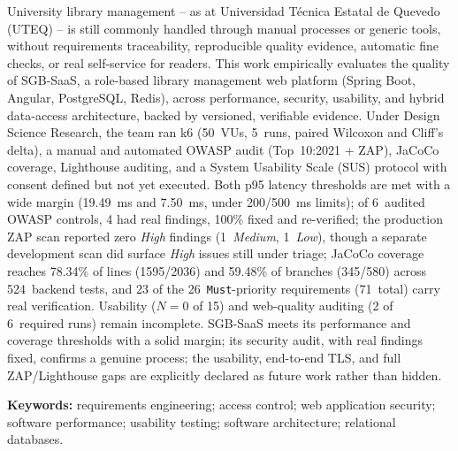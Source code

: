 University library management -- as at Universidad Técnica Estatal de
Quevedo (UTEQ) -- is still commonly handled through manual processes or
generic tools, without requirements traceability, reproducible quality
evidence, automatic fine checks, or real self-service for readers. This
work empirically evaluates the quality of SGB-SaaS, a role-based
library management web platform (Spring Boot, Angular, PostgreSQL,
Redis), across performance, security, usability, and hybrid data-access
architecture, backed by versioned, verifiable evidence. Under Design
Science Research, the team ran k6 (50~VUs, 5~runs, paired Wilcoxon and
Cliff's delta), a manual and automated OWASP audit (Top~10:2021 + ZAP),
JaCoCo coverage, Lighthouse auditing, and a System Usability Scale
(SUS) protocol with consent defined but not yet executed. Both p95
latency thresholds are met with a wide margin (19.49~ms and 7.50~ms,
under 200/500~ms limits); of 6~audited OWASP controls, 4 had real
findings, 100\% fixed and re-verified; the production ZAP scan reported
zero \emph{High} findings (1~\emph{Medium}, 1~\emph{Low}), though a
separate development scan did surface \emph{High} issues still under
triage; JaCoCo coverage reaches 78.34\% of lines (1595/2036) and 59.48\% of
branches (345/580) across 524~backend tests, and 23 of the
26~\texttt{Must}-priority
requirements (71~total) carry real verification. Usability
($N=0$ of 15) and web-quality auditing (2 of 6~required runs) remain
incomplete. SGB-SaaS meets its performance and coverage thresholds with
a solid margin; its security audit, with real findings fixed, confirms
a genuine process; the usability, end-to-end TLS, and full
ZAP/Lighthouse gaps are explicitly declared as future work rather than
hidden.

\textbf{Keywords:} requirements engineering; access control; web
application security; software performance; usability testing; software
architecture; relational databases.
